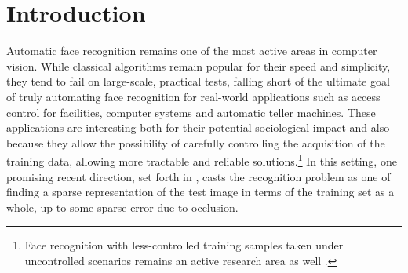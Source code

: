 \documentclass[10pt,twocolumn,letterpaper]{article}
\begin{document}
\section{Introduction}\vspace{-2mm}
Automatic face recognition remains one of the most active areas in computer vision. While classical algorithms \cite{Turk1991-CVPR,Belhumeur1997-PAMI} remain popular for their speed and simplicity, they tend to fail on large-scale, practical tests, falling short of the ultimate goal of truly automating face recognition for real-world applications such as access control for facilities, computer systems and automatic teller machines. These applications are interesting both for their potential sociological impact and also because they allow the possibility of carefully controlling the acquisition of the training data, allowing more tractable and reliable solutions.\footnote{Face recognition with less-controlled training samples taken under uncontrolled scenarios remains an active research area as well \cite{LFW}.} In this setting, one promising recent direction, set forth in \cite{Wright2008-PAMI}, casts the recognition problem as one of finding a sparse representation of the test image in terms of the training set as a whole, up to some sparse error due to occlusion. 
\end{document}
